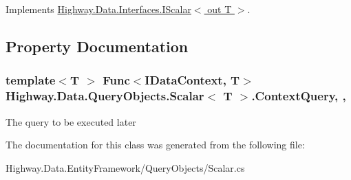 Implements \hyperlink{interface_highway_1_1_data_1_1_interfaces_1_1_i_scalar-g_a3a27ca86e587dbd0c1c199ae1cf54174}{Highway.\-Data.\-Interfaces.\-I\-Scalar$<$ out T $>$}.



\subsection{Property Documentation}
\hypertarget{class_highway_1_1_data_1_1_query_objects_1_1_scalar-g_acb183b773f6c4bb8c9a989c1144095db}{
\subsubsection[{Context\-Query}]{\setlength{\rightskip}{0pt plus 5cm}template$<$T $>$ Func$<${\bf I\-Data\-Context}, T$>$ {\bf Highway.\-Data.\-Query\-Objects.\-Scalar}$<$ T $>$.Context\-Query\hspace{0.3cm}{\ttfamily [get]}, {\ttfamily [set]}, {\ttfamily [protected]}}}\label{class_highway_1_1_data_1_1_query_objects_1_1_scalar-g_acb183b773f6c4bb8c9a989c1144095db}


The query to be executed later 



The documentation for this class was generated from the following file\-:\begin{DoxyCompactItemize}
\item 
Highway.\-Data.\-Entity\-Framework/\-Query\-Objects/Scalar.\-cs\end{DoxyCompactItemize}

